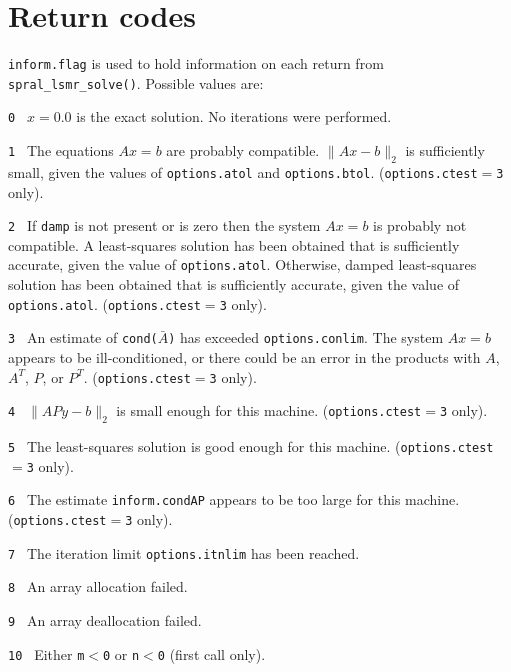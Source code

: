 
\section{Return codes} \label{LSMR:errors}

{\tt inform.flag} is used to hold
   information on each return from {\tt spral\_lsmr\_solve()}. 
Possible values are:
\begin{description}
\item{\tt 0 }  $x = 0.0$  is the exact solution.
               No iterations were performed.
\item{\tt 1 }  The equations $Ax = b$ are probably compatible.
               $\|Ax - b\|_2$ is sufficiently small, given the
               values of {\tt options.atol} and {\tt options.btol}. 
               ({\tt options.ctest}$ = ${\tt 3} only). 
\item{\tt 2 }  If {\tt damp} is not present or is zero then the system $Ax = b$
               is probably not compatible.  A least-squares solution has been
               obtained that is sufficiently accurate, given the value of
               {\tt options.atol}.  
               Otherwise, damped least-squares solution has been obtained that
               is sufficiently accurate, given the value of {\tt options.atol}.
               ({\tt options.ctest}$ = ${\tt 3} only). 
\item{\tt 3 }  An estimate of {\tt cond($\bar{A}$)} has exceeded
               {\tt options.conlim}. The system $Ax = b$ appears to be
               ill-conditioned, or there could be an error in the products 
               with $A$, $A^T$, $P$, or $P^T$. ({\tt options.ctest}$ = ${\tt 3}
               only). 
\item{\tt 4 }  $\|APy - b \|_2$ is small enough for this machine.
               ({\tt options.ctest}$ = ${\tt 3} only). 
\item{\tt 5 }  The least-squares solution is good enough for this
               machine. ({\tt options.ctest}$ = ${\tt 3} only). 
\item{\tt 6 }  The estimate {\tt inform.condAP} appears to be too large 
               for this machine.         
               ({\tt options.ctest}$ = ${\tt 3} only). 
\item{\tt 7 }  The iteration limit {\tt options.itnlim} has been reached. 
\item{\tt 8 }  An array allocation failed.
\item{\tt 9 }  An array deallocation failed.
\item{\tt 10 } Either  {\tt m$<$0} or {\tt n$<$0} (first call only).

\end{description}

